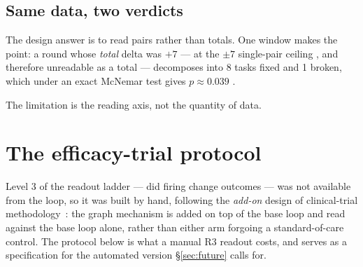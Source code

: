 \subsection*{Same data, two verdicts}

The design answer is to read pairs rather than totals. One window makes
the point: a round whose \emph{total} delta was $+7$
--- at the $\pm 7$ single-pair ceiling , and therefore unreadable as a
total --- decomposes into 8 tasks
fixed and 1 broken, which under an exact McNemar test gives $p \approx
0.039$ .

The limitation is the reading axis, not the quantity of data.

\section{The efficacy-trial protocol}
\label{sec:efficacy-protocol}

Level 3 of the readout ladder --- did firing change outcomes --- was not
available from the loop, so it was built by hand, following the
\emph{add-on} design of clinical-trial methodology~\cite{ich-e10}: the
graph mechanism is added on top of the base loop and read against the
base loop alone, rather than either arm forgoing a standard-of-care
control. The protocol below is what a manual R3 readout costs, and serves
as a specification for the automated version \S\ref{sec:future} calls
for.

